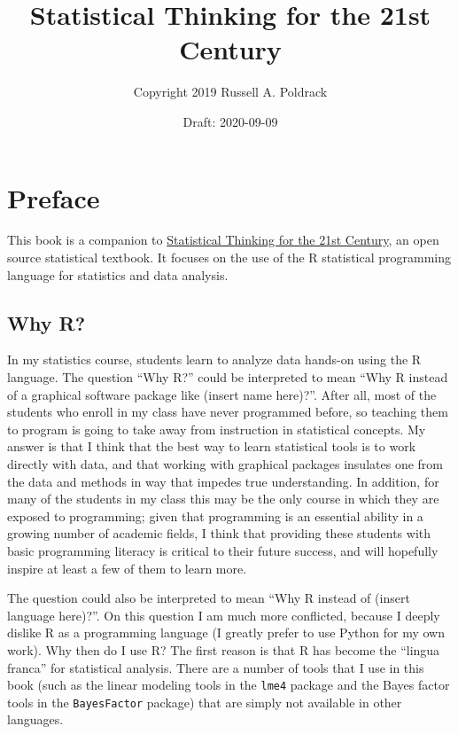 \documentclass[12pt,]{book}
\title{Statistical Thinking for the 21st Century}
\author{Copyright 2019 Russell A. Poldrack}
\date{Draft: 2020-09-09}
\begin{document}
\maketitle

{
\setcounter{tocdepth}{1}
\tableofcontents
}
\hypertarget{preface}{%
\chapter*{Preface}\label{preface}}

This book is a companion to \href{https://statsthinking21.org/}{Statistical Thinking for the 21st Century}, an open source statistical textbook. It focuses on the use of the R statistical programming language for statistics and data analysis.

\hypertarget{why-r}{%
\section{Why R?}\label{why-r}}

In my statistics course, students learn to analyze data hands-on using the R language. The question ``Why R?'' could be interpreted to mean ``Why R instead of a graphical software package like (insert name here)?''. After all, most of the students who enroll in my class have never programmed before, so teaching them to program is going to take away from instruction in statistical concepts. My answer is that I think that the best way to learn statistical tools is to work directly with data, and that working with graphical packages insulates one from the data and methods in way that impedes true understanding. In addition, for many of the students in my class this may be the only course in which they are exposed to programming; given that programming is an essential ability in a growing number of academic fields, I think that providing these students with basic programming literacy is critical to their future success, and will hopefully inspire at least a few of them to learn more.

The question could also be interpreted to mean ``Why R instead of (insert language here)?''. On this question I am much more conflicted, because I deeply dislike R as a programming language (I greatly prefer to use Python for my own work). Why then do I use R? The first reason is that R has become the ``lingua franca'' for statistical analysis. There are a number of tools that I use in this book (such as the linear modeling tools in the \texttt{lme4} package and the Bayes factor tools in the \texttt{BayesFactor} package) that are simply not available in other languages.
\end{document}
